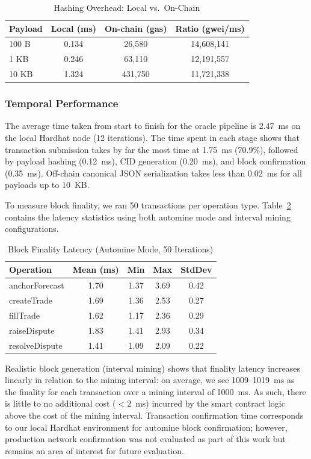\documentclass{ieeeaccess}
\begin{document}
\begin{table}[!t]
\caption{Hashing Overhead: Local vs.\ On-Chain}
\label{tab:hashing_overhead}
\centering
\begin{tabular}{lccc}
\toprule
\textbf{Payload} & \textbf{Local (ms)} & \textbf{On-chain (gas)} & \textbf{Ratio (gwei/ms)} \\
\midrule
100 B & 0.134 & 26,580 & 14,608,141 \\
1 KB & 0.246 & 63,110 & 12,191,557 \\
10 KB & 1.324 & 431,750 & 11,721,338 \\
\bottomrule
\end{tabular}
\end{table}

\subsubsection{Temporal Performance}

The average time taken from start to finish for the oracle pipeline is 2.47~ms on the local Hardhat node (12 iterations). The time spent in each stage shows that transaction submission takes by far the most time at 1.75~ms (70.9\%), followed by payload hashing (0.12~ms), CID generation (0.20~ms), and block confirmation (0.35~ms). Off-chain canonical JSON serialization takes less than 0.02~ms for all payloads up to 10~KB.

To measure block finality, we ran 50 transactions per operation type. Table~\ref{tab:finality} contains the latency statistics using both automine mode and interval mining configurations.

\begin{table}[!t]
\caption{Block Finality Latency (Automine Mode, 50 Iterations)}
\label{tab:finality}
\centering
\begin{tabular}{lcccc}
\toprule
\textbf{Operation} & \textbf{Mean (ms)} & \textbf{Min} & \textbf{Max} & \textbf{StdDev} \\
\midrule
anchorForecast & 1.70 & 1.37 & 3.69 & 0.42 \\
createTrade & 1.69 & 1.36 & 2.53 & 0.27 \\
fillTrade & 1.62 & 1.17 & 2.36 & 0.29 \\
raiseDispute & 1.83 & 1.41 & 2.93 & 0.34 \\
resolveDispute & 1.41 & 1.09 & 2.09 & 0.22 \\
\bottomrule
\end{tabular}
\end{table}
Realistic block generation (interval mining) shows that finality latency increases linearly in relation to the mining interval: on average, we see 1009--1019~ms as the finality for each transaction over a mining interval of 1000~ms. As such, there is little to no additional cost ($<2$~ms) incurred by the smart contract logic above the cost of the mining interval. Transaction confirmation time corresponds to our local Hardhat environment for automine block confirmation; however, production network confirmation was not evaluated as part of this work but remains an area of interest for future evaluation.
\end{document}
